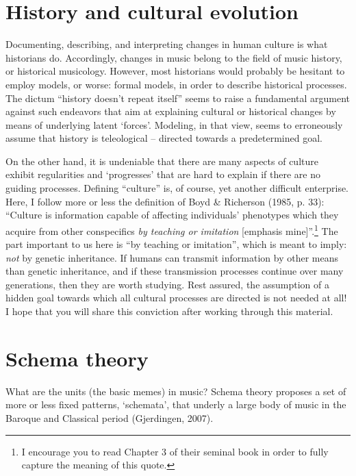 \documentclass[
  a4paperpaper,
  ,captions=tableheading
]{scrbook}
\begin{document}
\hypertarget{history-and-cultural-evolution}{%
\section{History and cultural
evolution}\label{history-and-cultural-evolution}}

Documenting, describing, and interpreting changes in human culture is
what historians do. Accordingly, changes in music belong to the field of
music history, or historical musicology. However, most historians would
probably be hesitant to employ models, or worse: formal models, in order
to describe historical processes. The dictum ``history doesn't repeat
itself'' seems to raise a fundamental argument against such endeavors
that aim at explaining cultural or historical changes by means of
underlying latent `forces'. Modeling, in that view, seems to erroneously
assume that history is teleological -- directed towards a predetermined
goal.

On the other hand, it is undeniable that there are many aspects of
culture exhibit regularities and `progresses' that are hard to explain
if there are no guiding processes. Defining ``culture'' is, of course,
yet another difficult enterprise. Here, I follow more or less the
definition of Boyd \& Richerson (1985, p. 33): ``Culture is information
capable of affecting individuals' phenotypes which they acquire from
other conspecifics \emph{by teaching or imitation} {[}emphasis
mine{]}''.\footnote{I encourage you to read Chapter 3 of their seminal
  book in order to fully capture the meaning of this quote.} The part
important to us here is ``by teaching or imitation'', which is meant to
imply: \emph{not} by genetic inheritance. If humans can transmit
information by other means than genetic inheritance, and if these
transmission processes continue over many generations, then they are
worth studying. Rest assured, the assumption of a hidden goal towards
which all cultural processes are directed is not needed at all! I hope
that you will share this conviction after working through this material.

\hypertarget{schema-theory}{%
\section{Schema theory}\label{schema-theory}}

What are the units (the basic memes) in music? Schema theory proposes a
set of more or less fixed patterns, `schemata', that underly a large
body of music in the Baroque and Classical period (Gjerdingen, 2007).
\end{document}
